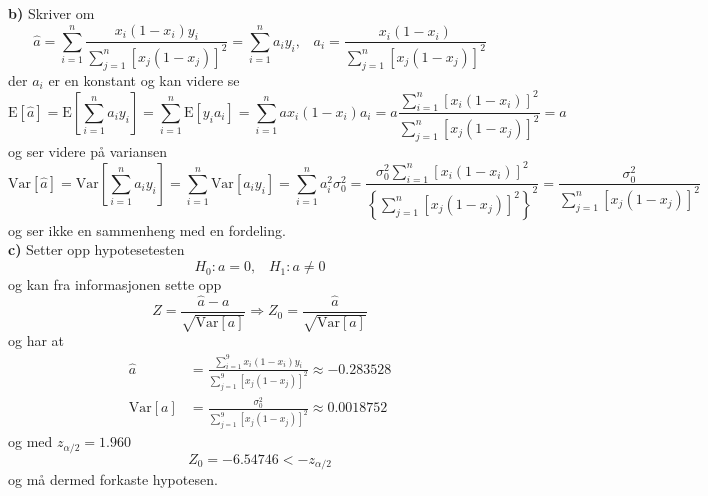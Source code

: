 \documentclass{report}
\newcommand{\bbrack}[1]{\left[ #1 \right]}
\newcommand{\cbrack}[1]{\left\lbrace #1 \right\rbrace}
\newcommand{\Var}[1]{\text{Var} \bbrack{ #1 }}
\newcommand{\fvv}[1]{\text{E} \bbrack{ #1 }}
\begin{document}
\textbf{b)}
Skriver om
\begin{equation}
  \label{eq:18}
  \widehat{a} = \sum_{i=1}^{n}  \frac{x_{i}(1 - x_{i})y_{i} }{ \sum_{j=1}^{n} \bbrack{ x_{j} (1-x_{j}) }^{2} } = \sum_{i=1}^{n} a_{i} y_{i}, \;\;\; a_{i} = \frac{x_{i}(1 - x_{i})}{ \sum_{j=1}^{n} \bbrack{ x_{j} (1-x_{j}) }^{2} }
\end{equation}
der $a_{i}$ er en konstant og kan videre se
\begin{equation}
  \label{eq:17}
  \fvv{\widehat{a}} = \fvv{ \sum_{i=1}^{n} a_{i} y_{i} } = \sum_{i=1}^{n} \fvv{ y_{i} a_{i} } = \sum_{i=1}^{n}ax_{i}(1-x_{i}) a_{i} = a \frac{ \sum_{i=1}^{n} \bbrack{ x_{i}(1-x_{i}) }^{2} }{ \sum_{j=1}^{n} \bbrack{ x_{j}(1-x_{j}) }^{2} } = a
\end{equation}
og ser videre på variansen
\begin{equation}
  \label{eq:19}
  \Var{ \widehat{a} } = \Var{ \sum_{i=1}^{n} a_{i} y_{i} } = \sum_{i=1}^{n} \Var{ a_{i} y_{i} } = \sum_{i=1}^{n} a_{i}^{2} \sigma_{0}^{2} = \frac{\sigma_{0}^{2} \sum_{i=1}^{n} \bbrack{x_{i}(1 - x_{i})}^{2}}{ \cbrack{ \sum_{j=1}^{n} \bbrack{ x_{j} (1-x_{j}) }^{2} }^{2} } = \frac{\sigma_{0}^{2}}{ \sum_{j=1}^{n} \bbrack{ x_{j}(1-x_{j}) }^{2} }
\end{equation}
og ser ikke en sammenheng med en fordeling. \\

\textbf{c)}
Setter opp hypotesetesten
\begin{equation}
  \label{eq:20}
  H_{0} : a = 0, \;\;\; H_{1} : a \neq 0
\end{equation}
og kan fra informasjonen sette opp
\begin{equation}
  \label{eq:21}
  Z = \frac{\widehat{a} - a}{\sqrt{\Var{a}}} \Rightarrow Z_{0} = \frac{\widehat{a}}{\sqrt{\Var{a}}}
\end{equation}
og har at
\begin{equation}
  \label{eq:22}
  \begin{split}
    \widehat{a} &= \frac{\sum_{i=1}^{9} x_{i}(1-x_{i})y_{i} }{ \sum_{j=1}^{9} \bbrack{ x_{j} (1-x_{j}) }^{2} } \approx -0.283528 \\
    \Var{a} &= \frac{\sigma_{0}^{2}}{\sum_{j=1}^{9} \bbrack{ x_{j}(1-x_{j}) }^{2}} \approx 0.0018752
  \end{split}
\end{equation}
og med $z_{\alpha / 2} = 1.960$
\begin{equation}
  \label{eq:24}
  Z_{0} = -6.54746 < -z_{\alpha / 2}
\end{equation}
og må dermed forkaste hypotesen.
\end{document}
